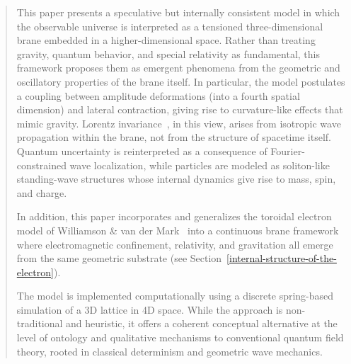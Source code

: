\begin{abstract}
This paper presents a speculative but internally consistent model in
which the observable universe is interpreted as a tensioned
three-dimensional brane embedded in a higher-dimensional space. Rather
than treating gravity, quantum behavior, and special relativity as
fundamental, this framework proposes them as emergent phenomena from the
geometric and oscillatory properties of the brane itself. In particular,
the model postulates a coupling between amplitude deformations (into a
fourth spatial dimension) and lateral contraction, giving rise to
curvature-like effects that mimic gravity. Lorentz invariance~\cite{Einstein1905,Rindler2006}, in this
view, arises from isotropic wave propagation within the brane, not from
the structure of spacetime itself. Quantum uncertainty is reinterpreted
as a consequence of Fourier-constrained wave localization, while
particles are modeled as soliton-like standing-wave structures whose
internal dynamics give rise to mass, spin, and charge.

In addition, this paper incorporates and generalizes the toroidal electron model
of Williamson \& van der Mark~\cite{Williamson1997} into a continuous brane framework
where electromagnetic confinement, relativity, and gravitation all emerge from the same
geometric substrate (see Section~\ref{internal-structure-of-the-electron}).

The model is implemented computationally using a discrete spring-based
simulation of a 3D lattice in 4D space. While the approach is
non-traditional and heuristic, it offers a coherent conceptual
alternative at the level of ontology and qualitative mechanisms to
conventional quantum field theory, rooted in classical determinism and
geometric wave mechanics.
\end{abstract}